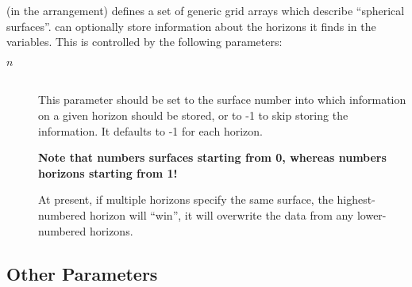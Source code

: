  (in the  arrangement)
defines a set of generic grid arrays which describe ``spherical surfaces''.
 can optionally store information about the
horizons it finds in the  variables.
This is controlled by the following parameters:
\begin{description}
\item[\code{which\_surface\_to\_store\_info[}$n$\code{]}]
\mbox{}\\
	This parameter should be set to the 
	surface number into which information on a given 
	horizon should be stored, or to -1 to skip storing the information.
	It defaults to -1 for each horizon.

	{\bf Note that  numbers surfaces
	starting from 0, whereas  numbers
	horizons starting from 1!}

	At present, if multiple  horizons
	specify the same  surface, the
	highest-numbered horizon will ``win'', \ie{} it will overwrite
	the data from any lower-numbered horizons.
\end{description}


\subsection{Other Parameters}
\label{AHFinderDirect/sect-parameters/other-parameters}

